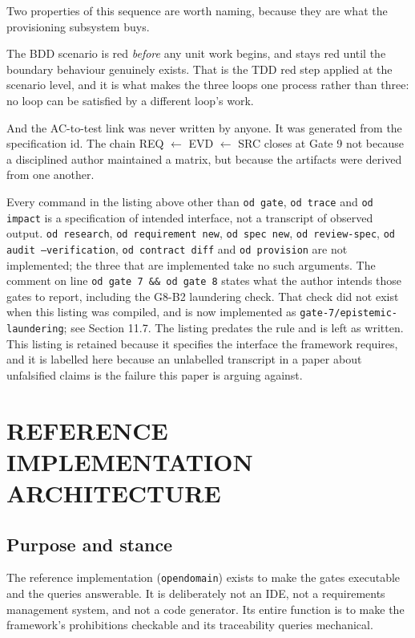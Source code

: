 \documentclass[11pt,a4paper]{article}
\begin{document}
Two properties of this sequence are worth naming, because they are what the provisioning subsystem buys.

The BDD scenario is red \emph{before} any unit work begins, and stays red until the boundary behaviour genuinely exists. That is the TDD red step applied at the scenario level, and it is what makes the three loops one process rather than three: no loop can be satisfied by a different loop's work.

And the AC-to-test link was never written by anyone. It was generated from the specification id. The chain REQ $\leftarrow$ EVD $\leftarrow$ SRC closes at Gate 9 not because a disciplined author maintained a matrix, but because the artifacts were derived from one another.

\noindent Every command in the listing above other than \texttt{od gate}, \texttt{od trace} and \texttt{od impact} is a specification of intended interface, not a transcript of observed output. \texttt{od research}, \texttt{od requirement new}, \texttt{od spec new}, \texttt{od review-spec}, \texttt{od audit --verification}, \texttt{od contract diff} and \texttt{od provision} are not implemented; the three that are implemented take no such arguments. The comment on line \texttt{od gate 7 \&\& od gate 8} states what the author intends those gates to report, including the G8-B2 laundering check. That check did not exist when this listing was compiled, and is now implemented as \texttt{gate-7/epistemic-laundering}; see Section 11.7. The listing predates the rule and is left as written. This listing is retained because it specifies the interface the framework requires, and it is labelled here because an unlabelled transcript in a paper about unfalsified claims is the failure this paper is arguing against.

\section{REFERENCE IMPLEMENTATION ARCHITECTURE}

\subsection{Purpose and stance}

The reference implementation (\texttt{opendomain}) exists to make the gates executable and the queries answerable. It is deliberately not an IDE, not a requirements management system, and not a code generator. Its entire function is to make the framework's prohibitions checkable and its traceability queries mechanical.
\end{document}
